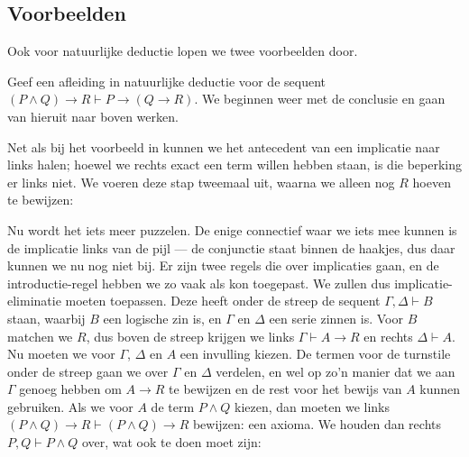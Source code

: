 \subsection{Voorbeelden}
Ook voor natuurlijke deductie lopen we twee voorbeelden door.

\begin{example}\label{ex:nd:export}
  Geef een afleiding in natuurlijke deductie voor de sequent $(P \land Q) \to R \vdash P \to (Q \to R)$. We beginnen weer met de conclusie en gaan van hieruit naar boven werken.

\begin{prooftree}
\end{prooftree}

Net als bij het voorbeeld in \lk{} kunnen we het antecedent van een implicatie naar links halen; hoewel we rechts exact een term willen hebben staan, is die beperking er links niet. We voeren deze stap tweemaal uit, waarna we alleen nog $R$ hoeven te bewijzen:

\begin{prooftree}
\end{prooftree}

  Nu wordt het iets meer puzzelen. De enige connectief waar we iets mee kunnen is de implicatie links van de pijl --- de conjunctie staat binnen de haakjes, dus daar kunnen we nu nog niet bij. Er zijn twee regels die over implicaties gaan, en de introductie-regel hebben we zo vaak als kon toegepast. We zullen dus implicatie-eliminatie moeten toepassen. Deze heeft onder de streep de sequent $\Gamma, \Delta \vdash B$ staan, waarbij $B$ een logische zin is, en $\Gamma$ en $\Delta$ een serie zinnen is. Voor $B$ matchen we $R$, dus boven de streep krijgen we links $\Gamma \vdash A \to R$ en rechts $\Delta \vdash A$. Nu moeten we voor $\Gamma$, $\Delta$ en $A$ een invulling kiezen. De termen voor de turnstile onder de streep gaan we over $\Gamma$ en $\Delta$ verdelen, en wel op zo'n manier dat we aan $\Gamma$ genoeg hebben om $A \to R$ te bewijzen en de rest voor het bewijs van $A$ kunnen gebruiken. Als we voor $A$ de term $P \land Q$ kiezen, dan moeten we links $(P \land Q) \to R \vdash (P \land Q) \to R$ bewijzen: een axioma. We houden dan rechts $P, Q \vdash P \land Q$ over, wat ook te doen moet zijn:


\end{example}
